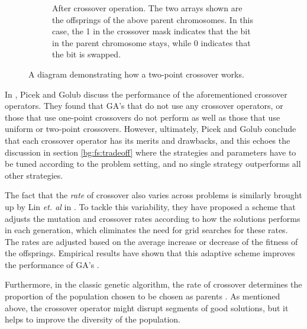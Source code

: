 \documentclass[12pt, twoside, a4paper]{report}
\begin{document}
\begin{figure}
\begin{subfigure}[b]{\textwidth}
\centering
{}
\caption{After crossover operation. The two arrays shown are the offsprings of the above parent chromosomes. In this case, the 1 in the crossover mask indicates that the bit in the parent chromosome stays, while 0 indicates that the bit is swapped.}
\label{bg:ga:crossover_b}
\end{subfigure}
\caption{A diagram demonstrating how a two-point crossover works.}
\label{bg:ga:crossover}
\end{figure}


In \cite{RefWorks:224}, Picek and Golub discuss the performance of the aforementioned crossover operators. They found that GA's that do not use any crossover operators, or those that use one-point crossovers do not perform as well as those that use uniform or two-point crossovers. However, ultimately, Picek and Golub conclude that each crossover operator has its merits and drawbacks, and this echoes the discussion in section \ref{bg:fs:tradeoff} where the strategies and parameters have to be tuned according to the problem setting, and no single strategy outperforms all other strategies.

The fact that the \textit{rate} of crossover also varies across problems is similarly brought up by Lin \textit{et. al} in \cite{RefWorks:225}. To tackle this variability, they have proposed a scheme that adjusts the mutation and crossover rates according to how the solutions performs in each generation, which eliminates the need for grid searches for these rates. The rates are adjusted based on the average increase or decrease of the fitness of the offsprings. Empirical results have shown that this adaptive scheme improves the performance of GA's \cite{RefWorks:225, RefWorks:226}.

Furthermore, in the classic genetic algorithm, the rate of crossover determines the proportion of the population chosen to be chosen as parents \cite{RefWorks:205}. As mentioned above, the crossover operator might disrupt segments of good solutions, but it helps to improve the diversity of the population.
\end{document}
